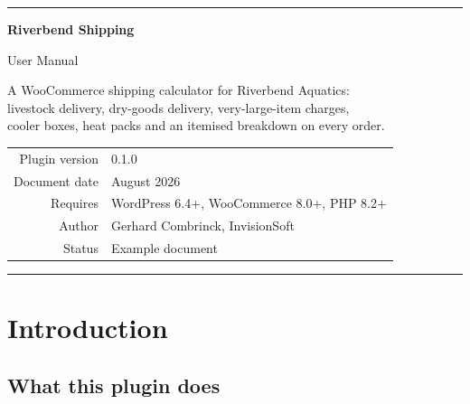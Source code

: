 \documentclass[11pt,a4paper,oneside]{report}
\begin{document}
\begin{titlepage}
\centering
\vspace*{3.2cm}

{\color{accent}\rule{4cm}{3pt}}

\vspace{1.2cm}
{\sffamily\bfseries\Huge\color{ink} Riverbend Shipping\par}
\vspace{0.5cm}
{\sffamily\LARGE\color{muted} User Manual\par}

\vspace{1.6cm}
{\large A WooCommerce shipping calculator for Riverbend Aquatics:\\
livestock delivery, dry-goods delivery, very-large-item charges,\\
cooler boxes, heat packs and an itemised breakdown on every order.\par}

\vfill

\begin{tabular}{rl}
\textsf{\small Plugin version} & \textsf{\small 0.1.0}\\[2pt]
\textsf{\small Document date} & \textsf{\small August 2026}\\[2pt]
\textsf{\small Requires} & \textsf{\small WordPress 6.4+, WooCommerce 8.0+, PHP 8.2+}\\[2pt]
\textsf{\small Author} & \textsf{\small Gerhard Combrinck, InvisionSoft}\\[2pt]
\textsf{\small Status} & \textsf{\small Example document}\\
\end{tabular}

\vspace{1.5cm}
{\color{accent}\rule{\textwidth}{1pt}}
\end{titlepage}

\tableofcontents
\thispagestyle{empty}

\chapter{Introduction}

\section{What this plugin does}
\end{document}
